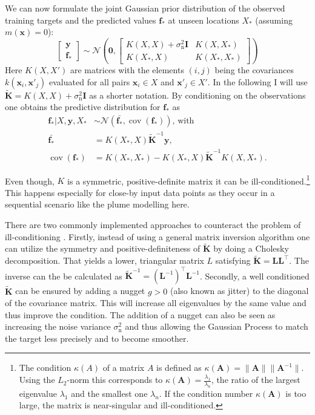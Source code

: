 \documentclass[11pt,a4paper]{scrreprt}
\newcommand{\vc}[1]{\bm{#1}}
\newcommand{\mat}[1]{\bm{#1}}
\newcommand{\T}{^{\top}}
\DeclareMathOperator{\cov}{cov}
\begin{document}
We can now formulate the joint Gaussian prior distribution of the observed 
training targets and the predicted values $\vc f_*$ at unseen locations $X_*$ 
(assuming $m(\vc x) = 0$):
\begin{equation}
    \left[ \begin{array}{c}\vc y \\ \vc f_* \end{array} \right]
    \sim \mathcal{N}\left(\vc 0,
        \left[ \begin{array}{cc}
            K(X, X) + \sigma_{\text{n}}^2 \mat I & K(X, X_*) \\ K(X_*, X) 
            & K(X_*, X_*)
        \end{array} \right]
    \right)
\end{equation}
Here $K(X, X')$ are matrices with the elements $(i, j)$ being the covariances 
$k(\vc x_i, \vc x'_j)$ evaluated for all pairs $\vc x_i \in X$ and $\vc x'_j \in 
X'$. In the following I will use $\tilde{\mat K} = K(X, X) + \sigma_{\text{n}}^2 
\mat I$ as a shorter notation. By conditioning on the observations one obtains 
the predictive distribution for $\vc f_*$ as
\begin{align}
    \vc f_* | X, \vc y, X_* &\sim \mathcal{N}(\bar{\vc f_*}, \cov(\vc 
    f_*))\text{, with}\\
    \bar{\vc f_*} &= K(X_*, X)\tilde{\mat K}^{-1} \vc y\text{,} \\
    \cov(\vc f_*) &= K(X_*, X_*) - K(X_*, X)\tilde{\mat K}^{-1}K(X, X_*)\text{.}
\end{align}

Even though, $K$ is a symmetric, positive-definite matrix it can be 
ill-conditioned.\footnote{The condition $\kappa(A)$ of a matrix $A$ is defined 
    as $\kappa(\mat A) = \|\mat A\| \|\mat A^{-1}\|$. Using the $L_2$-norm this 
    corresponds to $\kappa(\mat A) = \frac{\lambda_1}{\lambda_n}$,
    the ratio of the largest eigenvalue $\lambda_1$ and the smallest one
    $\lambda_n$. If the condition number $\kappa(\mat A)$ is too large, the 
    matrix is near-singular and ill-conditioned.} This happens especially for 
close-by input data points as they occur in a sequential scenario like the plume 
modelling here.

There are two commonly implemented approaches to counteract the problem of 
ill-conditioning \parencite[cp.]{Sacks:1989cv, Neal:1997tj, Booker:1999wz, 
    Gramacy:2008es}. Firstly, instead of using a general matrix inversion 
algorithm one can utilize the symmetry and positive-definiteness of $\tilde{\mat 
    K}$ by doing a Cholesky decomposition. That yields a lower, triangular 
matrix $L$ satisfying $\tilde{\mat K} = \mat L\mat L\T$. The inverse can the be 
calculated as $\tilde{\mat K}^{-1} = (\mat L^{-1})\T \mat L^{-1}$. Secondly, 
a well conditioned $\tilde{\mat K}$ can be ensured by adding a nugget $g > 0$ 
(also known as jitter) to the diagonal of the covariance matrix. This will 
increase all eigenvalues by the same value and thus improve the condition.  The 
addition of a nugget can also be seen as increasing the noise variance 
$\sigma_{\text{n}}^2$ and thus allowing the Gaussian Process to match the target 
less precisely and to become smoother.
\end{document}
